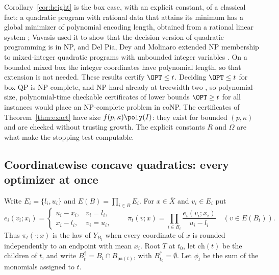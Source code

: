\begin{remark}\label{rem:np}
Corollary~\ref{cor:height} is the box case, with an explicit constant, of a
classical fact: a quadratic program with rational data that attains its
minimum has a global minimizer of polynomial encoding length, obtained from
a rational linear system \cite{Vavasis1990}; Vavasis used it to show that the
decision version of quadratic programming is in NP, and Del Pia, Dey and
Molinaro extended NP membership to mixed-integer quadratic programs with
unbounded integer variables \cite{DelPiaDeyMolinaro2017}. On a bounded
mixed box the integer coordinates have polynomial length, so that extension
is not needed. These results certify $\OPT\le t$. Deciding $\OPT\le t$ for
box QP is NP-complete, and NP-hard already at treewidth two
\cite{DelPiaKhajavirad2026}, so polynomial-size, polynomial-time checkable
certificates of lower bounds $\OPT\ge t$ for all instances would place an
NP-complete problem in coNP. The
certificates of Theorem~\ref{thm:exact} have size $f(p,\kappa)\poly(I)$:
they exist for bounded $(p,\kappa)$ and are checked without trusting
growth. The explicit constants $R$ and $\Omega$ are what make the stopping test
computable.
\end{remark}


\subsection{Coordinatewise concave quadratics: every optimizer at once}\label{sec:endpointset}

Write $E_i=\{l_i,u_i\}$ and $E(B)=\prod_{i\in B}E_i$. For $x\in\bar X$ and
$v_i\in E_i$ put
\[
e_i(v_i;x_i)=\begin{cases}u_i-x_i,&v_i=l_i,\\ x_i-l_i,&v_i=u_i,\end{cases}
\qquad
\pi_t(v;x)=\prod_{i\in B_t}\frac{e_i(v_i;x_i)}{u_i-l_i}\quad(v\in E(B_t)).
\]
Thus $\pi_t(\cdot;x)$ is the law of $Y_{B_t}$ when every coordinate of $x$
is rounded independently to an endpoint with mean $x_i$. Root $T$ at $t_0$,
let $\mathrm{ch}(t)$ be the children of $t$, and write
$B_t^{\uparrow}=B_t\cap B_{\mathrm{pa}(t)}$, with $B_{t_0}^{\uparrow}=\emptyset$.
Let $\phi_t$ be the sum of the monomials assigned to $t$.

